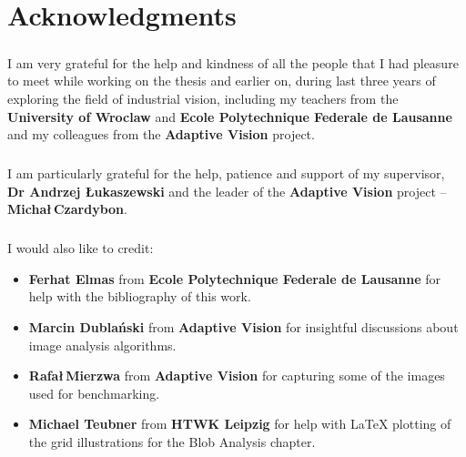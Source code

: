 ﻿\chapter{Acknowledgments} 

\paragraph*{}
I am very grateful for the help and kindness of all the people that I had pleasure to meet while working on the thesis and earlier on, during last three years of exploring the field of industrial vision, including my teachers from the \textbf{University of Wroclaw} and \textbf{Ecole Polytechnique Federale de Lausanne} and my colleagues from the \textbf{Adaptive Vision} project.

\paragraph*{}
I am particularly grateful for the help, patience and support of my supervisor, \textbf{Dr Andrzej \L ukaszewski} and the leader of the \textbf{Adaptive Vision} project -- \textbf{Micha\l \,Czardybon}. 

\paragraph*{}
I would also like to credit:
\begin{itemize}
	\item \textbf{Ferhat Elmas} from \textbf{Ecole Polytechnique Federale de Lausanne} for help with the bibliography of this work.
	\item \textbf{Marcin Dubla\'nski} from \textbf{Adaptive Vision} for insightful discussions about image analysis algorithms.
	\item \textbf{Rafa\l  \,Mierzwa} from \textbf{Adaptive Vision} for capturing some of the images used for benchmarking.
	\item \textbf{Michael Teubner} from \textbf{HTWK Leipzig} for help with LaTeX plotting of the grid illustrations for the Blob Analysis chapter.
\end{itemize} 
\pagebreak 